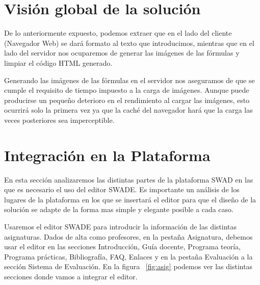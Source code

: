 \section{Visión global de la solución}
De lo anteriormente expuesto, podemos extraer que en el lado del cliente (Navegador Web) se dará formato al texto que introducimos, mientras que en el lado del servidor nos ocuparemos de generar las imágenes de las fórmulas y limpiar el código HTML generado.

Generando las imágenes de las fórmulas en el servidor nos aseguramos de que se cumple el requisito de tiempo impuesto a la carga de imágenes. Aunque puede producirse un pequeño deterioro en el rendimiento al cargar las imágenes, esto ocurrirá solo la primera vez ya que la caché del navegador hará que la carga las veces posteriores sea imperceptible. 

\section{Integración en la Plataforma}

En esta sección analizaremos las distintas partes de la plataforma SWAD en las que es necesario el uso del editor SWADE. Es importante un análisis de los lugares de la plataforma en los que se insertará el editor para que el diseño de la solución se adapte de la forma mas simple y elegante posible a cada caso.

Usaremos el editor SWADE para introducir la información de las distintas asignaturas. Dados de alta como profesores, en la pestaña Asignatura, debemos usar el editor en las secciones Introducción, Guía docente, Programa teoría, Programa prácticas,  Bibliografía, FAQ, Enlaces y en la pestaña Evaluación a la sección Sistema de Evaluación. En la figura ~\ref{fig:asig} podemos ver las distintas secciones donde vamos a integrar el editor.


